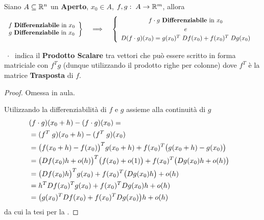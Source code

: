 \begin{proposition}
	\label{prop:diff_prod_scal}
	Siano $A \subseteq \mathbb{R}^n$ un \textbf{Aperto}, $x_0 \in A$, $f, g:\; A \to \mathbb{R}^m$, allora
	\[
		\left.
		\begin{array}{c}
			f \text{ \textbf{Differenziabile} in } x_0\\
			g \text{ \textbf{Differenziabile} in } x_0
		\end{array}
		\right\}
		\quad \implies \quad
		\begin{cases}
			\begin{array}{c}
				f \cdot g \text{ \textbf{Differenziabile} in } x_0\\
				e\\
				D(f \cdot g)(x_0) = g(x_0)^T \; Df(x_0) + f(x_0)^T \; Dg(x_0)
			\end{array}
		\end{cases}
	\]
	\vspace*{-\baselineskip}
	\begin{note}
		$\;\cdot\;$ indica il \textbf{Prodotto Scalare} tra vettori che può essere scritto in forma matriciale con $f^T g$ (dunque utilizzando il prodotto righe per colonne) dove $f^T$ è la matrice \textbf{Trasposta} di $f$.
	\end{note}
	\begin{proof}
		Omessa in aula.

		\cbstart
		\noindent Utilizzando la differenziabilità di $f$ e $g$ assieme alla continuità di $g$
		\begin{align*}
			\lefteqn{(f \cdot g)(x_0 + h) - (f \cdot g)(x_0) =}\\
			&= (f^T\;g)(x_0 + h) - (f^T\;g)(x_0)\\
			&= \bigl( f(x_0 + h) - f(x_0) \bigr)^T g(x_0 + h) + f(x_0)^T \bigl( g(x_0 + h) - g(x_0) \bigr)\\
			&= \bigl( Df(x_0)h + o(h) \bigr)^T \bigl( f(x_0) + o(1) \bigr) + f(x_0)^T \bigl( Dg(x_0)h + o(h) \bigr)\\
			&= \bigl( Df(x_0)h \bigr)^T g(x_0) + f(x_0)^T \bigl( Dg(x_0) h \bigr) + o(h)\\
			&= h^T Df(x_0)^T g(x_0) + f(x_0)^T Dg(x_0)h + o(h)\\
			&= \bigl( g(x_0)^T Df(x_0) + f(x_0)^T Dg(x_0) \bigr) h + o(h)
		\end{align*}
		da cui la tesi per la .
		\cbend
	\end{proof}
\end{proposition}
